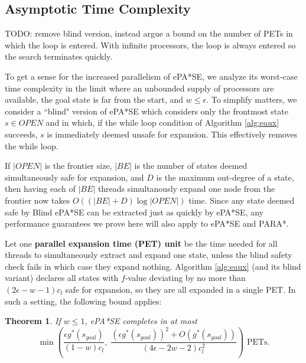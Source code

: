 \documentclass[letterpaper]{article}
\newtheorem{thm}{Theorem}
\begin{document}
\subsection{Asymptotic Time Complexity}

TODO: remove blind version, instead argue a bound on the number of PETs in which the loop is entered. With infinite processors, the loop is always entered so the search terminates quickly.

To get a sense for the increased parallelism of ePA*SE, we analyze its worst-case time complexity in the limit where an unbounded supply of processors are available, the goal state is far from the start, and $w \le \epsilon$. To simplify matters, we consider a ``blind" version of ePA*SE which considers only the frontmost state $s\in OPEN$ and in which, if the while loop condition of Algorithm \ref{alg:eaux} succeeds, $s$ is immediately deemed unsafe for expansion. This effectively removes the while loop. 

If $|OPEN|$ is the frontier size, $|BE|$ is the number of states deemed simultaneously safe for expansion, and $D$ is the maximum out-degree of a state, then having each of $|BE|$ threads simultanously expand one node from the frontier now takes $O\left((|BE|+D)\log|OPEN|\right)$ time. Since any state deemed safe by Blind ePA*SE can be extracted just as quickly by ePA*SE, any performance guarantees we prove here will also apply to ePA*SE and PARA*.

Let one \textbf{parallel expansion time (PET) unit} be the time needed for all threads to simultaneously extract and expand one state, unless the blind safety check fails in which case they expand nothing. Algorithm \ref{alg:eaux} (and its blind variant) declares all states with $f$-value deviating by no more than $(2\epsilon-w-1)c_l$ safe for expansion, so they are all expanded in a single PET. In such a setting, the following bound applies:

\begin{thm}
\label{thm:depth}
If $w \le 1$, ePA*SE completes in at most
\[\min\left(\frac{\epsilon g^*(s_{goal})}{(1-w)c_l},\;
\frac{\left(\epsilon g^*(s_{goal})\right)^2 + O(g^*(s_{goal})) }{(4\epsilon-2w-2)c_l^2} \right)\text{ PETs.}\]
\end{thm}
\end{document}
